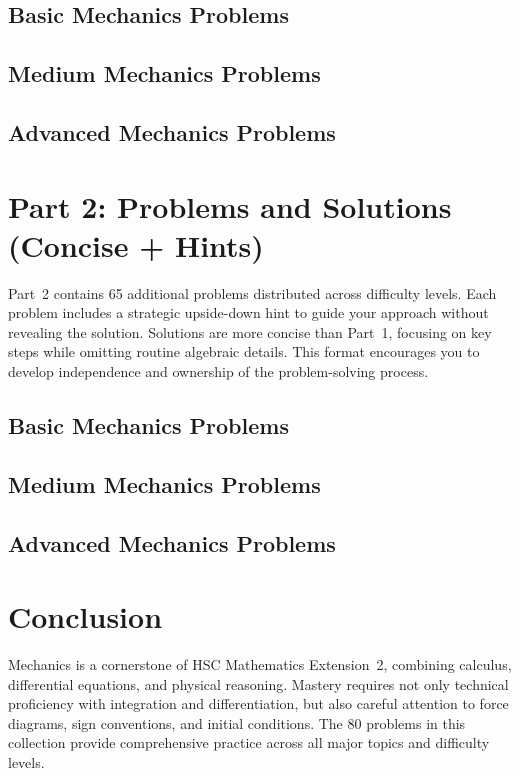 \documentclass[12pt]{article}
\begin{document}
\subsection{Basic Mechanics Problems}


\subsection{Medium Mechanics Problems}


\subsection{Advanced Mechanics Problems}


\section{Part 2: Problems and Solutions (Concise + Hints)}
Part~2 contains 65 additional problems distributed across difficulty levels. Each problem includes a strategic upside-down hint to guide your approach without revealing the solution. Solutions are more concise than Part~1, focusing on key steps while omitting routine algebraic details. This format encourages you to develop independence and ownership of the problem-solving process.

\subsection{Basic Mechanics Problems}


\subsection{Medium Mechanics Problems}


\subsection{Advanced Mechanics Problems}


\section{Conclusion}
Mechanics is a cornerstone of HSC Mathematics Extension~2, combining calculus, differential equations, and physical reasoning. Mastery requires not only technical proficiency with integration and differentiation, but also careful attention to force diagrams, sign conventions, and initial conditions. The 80 problems in this collection provide comprehensive practice across all major topics and difficulty levels.
\end{document}
